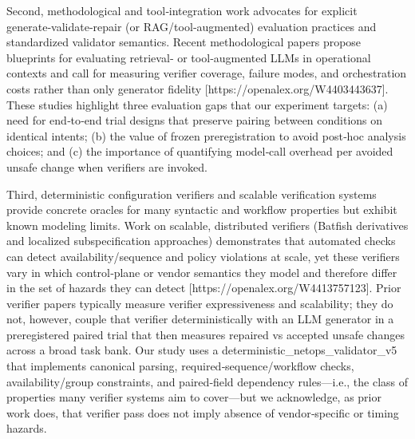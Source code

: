 \documentclass[conference]{IEEEtran}
\begin{document}
Second, methodological and tool‑integration work advocates for explicit generate‑validate‑repair (or RAG/tool‑augmented) evaluation practices and standardized validator semantics. Recent methodological papers propose blueprints for evaluating retrieval‑ or tool‑augmented LLMs in operational contexts and call for measuring verifier coverage, failure modes, and orchestration costs rather than only generator fidelity [https://openalex.org/W4403443637]. These studies highlight three evaluation gaps that our experiment targets: (a) need for end‑to‑end trial designs that preserve pairing between conditions on identical intents; (b) the value of frozen preregistration to avoid post‑hoc analysis choices; and (c) the importance of quantifying model‑call overhead per avoided unsafe change when verifiers are invoked.

Third, deterministic configuration verifiers and scalable verification systems provide concrete oracles for many syntactic and workflow properties but exhibit known modeling limits. Work on scalable, distributed verifiers (Batfish derivatives and localized subspecification approaches) demonstrates that automated checks can detect availability/sequence and policy violations at scale, yet these verifiers vary in which control‑plane or vendor semantics they model and therefore differ in the set of hazards they can detect [https://openalex.org/W4413757123]. Prior verifier papers typically measure verifier expressiveness and scalability; they do not, however, couple that verifier deterministically with an LLM generator in a preregistered paired trial that then measures repaired vs accepted unsafe changes across a broad task bank. Our study uses a deterministic\_netops\_validator\_v5 that implements canonical parsing, required‑sequence/workflow checks, availability/group constraints, and paired‑field dependency rules---i.e., the class of properties many verifier systems aim to cover---but we acknowledge, as prior work does, that verifier pass does not imply absence of vendor‑specific or timing hazards.
\end{document}
